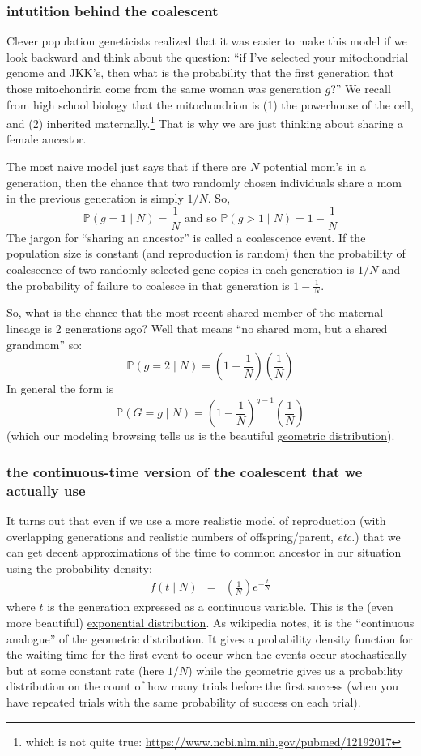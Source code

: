 \documentclass[11pt]{article}
\renewcommand{\Pr}{\mathbb{P}}
\newcommand{\href}[2]{\url{#2}}
\begin{document}
\subsubsection{intutition behind the coalescent}
Clever population geneticists realized that it was easier to make this model if
we look backward and think about the question: ``if I've selected your 
mitochondrial genome and JKK's, then what is the probability that the
first generation that those mitochondria come from the same woman was generation $g$?''
We recall from high school biology that the mitochondrion is (1) the powerhouse of
the cell, and (2) inherited maternally.\footnote{which is not quite true: \url{https://www.ncbi.nlm.nih.gov/pubmed/12192017}}
That is why we are just thinking about sharing a female ancestor.

The most naive model just says that if there are $N$ potential mom's in a generation,
then the chance that two randomly chosen individuals share a mom in 
the previous generation is simply $1/N$.
So,
$$\Pr(g=1\mid N) = \frac{1}{N} \mbox{ and so } \Pr(g>1\mid N) = 1- \frac{1}{N} $$
The jargon for ``sharing an ancestor'' is called a coalescence event.
If the population size is constant (and reproduction is random) then
the probability of coalescence of two randomly selected gene copies in each generation is $1/N$ and the probability of failure to coalesce in that generation is $1- \frac{1}{N}$.

So, what is the chance that the most recent shared member of the maternal lineage is
2 generations ago?  
Well that means ``no shared mom, but a shared grandmom'' so:
$$\Pr(g=2\mid N) = \left(1 - \frac{1}{N}\right)\left(\frac{1}{N}\right)$$
In general the form is
$$\Pr(G=g\mid N) = \left(1 - \frac{1}{N}\right)^{g-1}\left(\frac{1}{N}\right)$$
(which our modeling browsing tells us is the beautiful 
\href{https://en.wikipedia.org/wiki/Geometric_distribution}{geometric distribution}).

\subsubsection{the continuous-time version  of the coalescent that we actually use}
It turns out that even if we use a more realistic model of reproduction (with overlapping generations and realistic numbers of offspring/parent, {\em etc.})
that we can get decent approximations of the time to common ancestor in 
our situation using the probability density:
\begin{eqnarray}
    f(t\mid N) & = & \left(\frac{1}{N}\right)e^{-\frac{t}{N}}
\end{eqnarray}
where $t$ is the generation expressed as a continuous variable.
This is the (even more beautiful) \href{https://en.wikipedia.org/wiki/Exponential_distribution}{exponential distribution}.
As wikipedia notes, it is the ``continuous analogue'' of the
geometric distribution. 
It gives a probability density function for the waiting time for the first
    event to occur when the events occur stochastically but 
    at some constant rate (here $1/N$)
while the geometric gives us a probability distribution 
    on the count of how many trials before the first success (when 
    you have repeated trials with the same probability of success on each trial).
\end{document}
